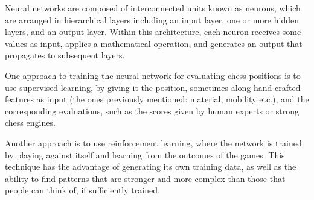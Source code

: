 Neural networks are composed of interconnected units known as neurons, which are arranged in hierarchical layers including an input layer, one or more hidden layers, and an output layer. Within this architecture, each neuron receives some values as input, applies a mathematical operation, and generates an output that propagates to subsequent layers.

One approach to training the neural network for evaluating chess positions is to use supervised learning, by giving it the position, sometimes along hand-crafted features as input (the ones previously mentioned: material, mobility etc.), and the corresponding evaluations, such as the scores given by human experts or strong chess engines.

Another approach is to use reinforcement learning, where the network is trained by playing against itself and learning from the outcomes of the games. This technique has the advantage of generating its own training data, as well as the ability to find patterns that are stronger and more complex than those that people can think of, if sufficiently trained.